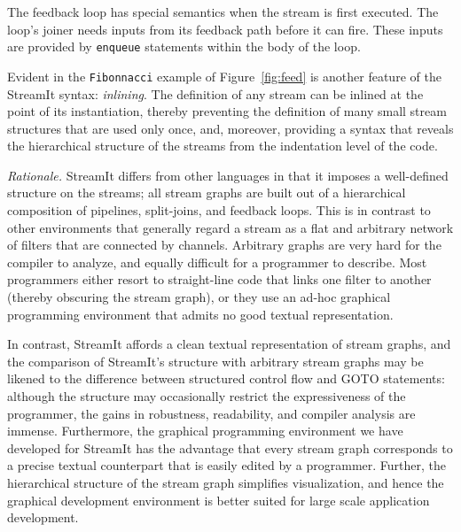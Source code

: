 The  feedback loop  has special  semantics  when the  stream is  first
executed.   The loop's  joiner  needs inputs  from  its feedback  path
before  it can fire.   These inputs  are provided  by \texttt{enqueue}
statements within the body of the loop.

Evident in the \texttt{Fibonnacci} example of Figure~\ref{fig:feed} is
another  feature   of  the  StreamIt   syntax:  \emph{inlining}.   The
definition  of  any  stream  can  be  inlined  at  the  point  of  its
instantiation, thereby preventing the  definition of many small stream
structures that are used only  once, and, moreover, providing a syntax
that  reveals  the hierarchical  structure  of  the  streams from  the
indentation level of the code.

\emph{Rationale.}  StreamIt differs from other languages in that it
imposes a well-defined structure on the streams; all stream graphs are
built out of a hierarchical composition of pipelines, split-joins, and
feedback  loops.   This is  in  contrast  to  other environments  that
generally regard a  stream as a flat and  arbitrary network of filters
that are  connected by channels.   Arbitrary graphs are very  hard for
the compiler  to analyze,  and equally difficult  for a  programmer to
describe.  Most  programmers either resort to  straight-line code that
links one filter  to another (thereby obscuring the  stream graph), or
they use  an ad-hoc graphical  programming environment that  admits no
good textual representation.

In contrast, StreamIt affords a clean textual representation of stream
graphs,  and the  comparison  of StreamIt's  structure with  arbitrary
stream  graphs may  be likened  to the  difference  between structured
control  flow  and  GOTO   statements:  although  the  structure  may
occasionally restrict the expressiveness  of the programmer, the gains
in  robustness,  readability,   and  compiler  analysis  are  immense.
Furthermore, the  graphical programming environment  we have developed
for StreamIt has the advantage  that every stream graph corresponds to
a precise textual  counterpart that is easily edited  by a programmer.
Further,  the hierarchical  structure of  the stream  graph simplifies
visualization,  and  hence  the  graphical development  environment  is
better suited for large scale application development.


